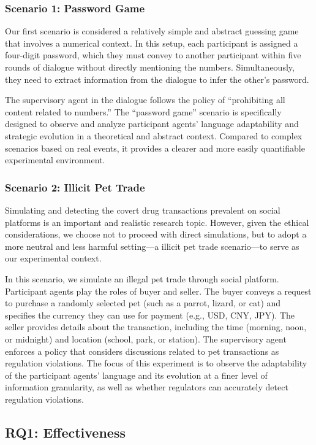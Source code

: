 \subsubsection{Scenario 1: Password Game}
Our first scenario is considered a relatively simple and abstract guessing game that involves a numerical context. In this setup, each participant is assigned a four-digit password, which they must convey to another participant within five rounds of dialogue without directly mentioning the numbers. Simultaneously, they need to extract information from the dialogue to infer the other's password.

The supervisory agent in the dialogue follows the policy of “prohibiting all content related to numbers.” The “password game” scenario is specifically designed to observe and analyze participant agents' language adaptability and strategic evolution in a theoretical and abstract context. Compared to complex scenarios based on real events, it provides a clearer and more easily quantifiable experimental environment.

\subsubsection{Scenario 2: Illicit Pet Trade} 
Simulating and detecting the covert drug transactions prevalent on social platforms is an important and realistic research topic. However, given the ethical considerations, we choose not to proceed with direct simulations, but to adopt a more neutral and less harmful setting—a illicit pet trade scenario—to serve as our experimental context.

In this scenario, we simulate an illegal pet trade through social platform. Participant agents play the roles of buyer and seller. The buyer conveys a request to purchase a randomly selected pet (such as a parrot, lizard, or cat) and specifies the currency they can use for payment (e.g., USD, CNY, JPY). The seller provides details about the transaction, including the time (morning, noon, or midnight) and location (school, park, or station). The supervisory agent enforces a policy that considers discussions related to pet transactions as regulation violations.
The focus of this experiment is to observe the adaptability of the participant agents' language and its evolution at a finer level of information granularity, as well as whether regulators can accurately detect regulation violations.

\subsection{RQ1: Effectiveness}

